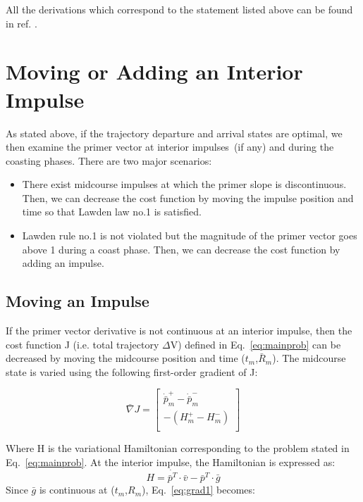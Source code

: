 \documentclass[12pt]{report}
\begin{document}
\noindent All the derivations which correspond to the statement
listed above can be found in ref. \cite{Schiff01}.

\section{Moving or Adding an Interior Impulse}
As stated above, if the trajectory departure and arrival states
are optimal, we then examine the primer vector at interior
impulses \,(if any) and during the coasting phases. There are two
major scenarios:
\begin{itemize}
\item There exist midcourse impulses at which the primer slope is
discontinuous. Then, we can decrease the cost function by moving
the impulse position and time so that Lawden law no.1 is
satisfied.\\
\item Lawden rule no.1 is not violated but the magnitude of the
primer vector goes above 1 during a coast phase. Then, we can
decrease the cost function by adding an impulse.\\
\end{itemize}

\subsection{Moving an Impulse}
If the primer vector derivative is not continuous at an interior
impulse, then the cost function J (i.e. total trajectory
$\Delta$V) defined in Eq.~\ref{eq:mainprob} can be decreased by
moving the midcourse position and time ($t_{m}$,$\bar R_{m}$). The
midcourse state is varied using the following first-order gradient
of J:

\begin{equation}
\bar \nabla J = \left[ \begin{array}{c}
 \dot{\bar p}_{m}^{+} - \dot{\bar p}_{m}^{-} \\
 -(H_{m}^{+} - H_{m}^{-}) \\
\end{array} \right]
\label{eq:grad1}
\end{equation}

\noindent Where H is the variational Hamiltonian corresponding to
the problem stated in Eq.~\ref{eq:mainprob}. At the interior
impulse, the Hamiltonian is expressed as:
\begin{equation}
H = \dot{\bar p^{T}}\cdot\bar v - {\bar p}^{T}\cdot\bar g
\end{equation}
\noindent Since $\bar g$ is continuous at ($t_{m}$,$R_{m}$),
Eq.~\ref{eq:grad1} becomes:
\end{document}
